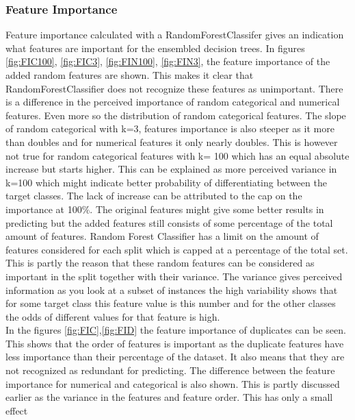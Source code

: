 \documentclass[a4paper,10pt]{article}
\begin{document}
\subsubsection{Feature Importance}\label{chapter312}
Feature importance calculated with a RandomForestClassifer gives an indication what features are important for the ensembled decision trees. In figures \ref{fig:FIC100}, \ref{fig:FIC3}, \ref{fig:FIN100}, \ref{fig:FIN3}, the feature importance of the added random features are shown. This makes it clear that RandomForestClassifier does not recognize these features as unimportant. There is a difference in the perceived importance of random categorical and numerical features. Even more so the distribution of random categorical features. The slope of random categorical with k=3, features importance is also steeper as it more than doubles and for numerical features it only nearly doubles. This is however not true for random categorical features with k= 100 which has an equal absolute increase but starts higher. This can be explained as more perceived variance in k=100 which might indicate better probability of differentiating between the target classes. The lack of increase can be attributed to the cap on the importance at 100$\%$. The original features might give some better results in predicting but the added features still consists of some percentage of the total amount of features. Random Forest Classifier has a limit on the amount of features considered for each split which is capped at a percentage of the total set. This is partly the reason that these random features can be considered as important in the split together with their variance. The variance gives perceived information as you look at a subset of instances the high variability shows that for some target class this feature value is this number and for the other classes the odds of different values for that feature is high. 
\\

In the figures \ref{fig:FIC},\ref{fig:FID} the feature importance of duplicates can be seen. This shows that the order of features is important as the duplicate features have less importance than their percentage of the dataset. It also means that they are not recognized as redundant for predicting. The difference between the feature importance for numerical and categorical is also shown. This is partly discussed earlier as the variance in the features and feature order. This has only a small effect 
\end{document}
